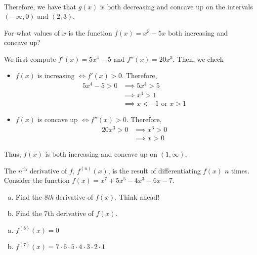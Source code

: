 \documentclass[11pt]{exam}
\begin{document}
\begin{questions}
\begin{solution}
\begin{itemize}
\begin{align*}
      \end{align*}
    \end{itemize}
    Therefore, we have that \(g(x)\) is both decreasing and concave up
    on the intervals \((-\infty,0)\) and \((2,3)\).
  \end{solution}
\question For what values of $x$ is the function $f(x)=x^5-5x$ both increasing and concave up?	
  \begin{solution}
    We first compute \(f'(x) = 5x^4-5\) and \(f''(x) = 20x^3\). Then,
    we check
    \begin{itemize}
    \item \(f(x)\) is increasing \(\iff f'(x) > 0\). Therefore,
      \begin{align*}
        5x^4-5 > 0 & \implies 5x^4 > 5 \\
                   & \implies x^4 > 1 \\
        & \implies x < -1 \text{ or } x>1
      \end{align*}
    \item \(f(x)\) is concave up \(\iff f''(x) > 0\). Therefore,
      \begin{align*}
        20x^3 > 0 & \implies x^3 > 0\\
        & \implies x > 0
      \end{align*}
    \end{itemize}
    Thus, \(f(x)\) is both increasing and concave up on \((1,\infty)\).
  \end{solution}
\question The $n^{\text{th}}$ derivative of $f$, $f^{(n)}(x)$, is the result of differentiating $f(x)$ $n$ times. Consider the function $f(x) = x^7 + 5x^5 - 4x^3 + 6x - 7$.
\begin{enumerate}[(a)]
	\item Find the \emph{8th} derivative of $f(x)$. Think ahead!
	\item Find the 7th derivative of $f(x)$.
\end{enumerate}
\begin{solution}
  \begin{enumerate}[(a)]
  \item \(f^{(8)}(x) = 0\)
  \item \(f^{(7)}(x) = 7 \cdot 6 \cdot 5 \cdot 4 \cdot 3 \cdot 2 \cdot
    1\)
  \end{enumerate}
\end{solution}
        
\question
\end{questions}
\end{document}
